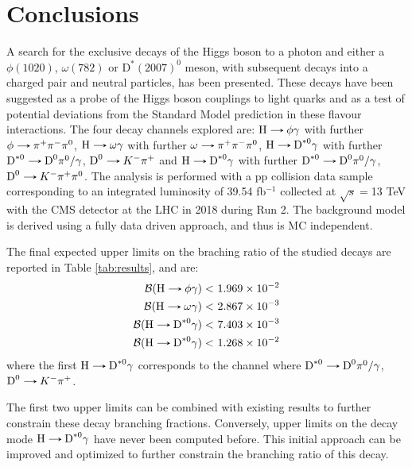 \chapter*{Conclusions}\label{chap:conclusions}

A search for the exclusive decays of the Higgs boson to a photon and either a $\phi(1020)$, $\omega(782)$ or $\text{D}^{*}(2007)^{0}$ meson, with subsequent decays into a charged pair and neutral particles, has been presented. These decays have been suggested as a probe of the Higgs boson couplings to light quarks and as a test of potential deviations from the Standard Model prediction in these flavour interactions. The four decay channels explored are: $\text{H}\decaysto \phi\gamma$ with further $\phi\decaysto \pi^+\pi^-\pi^0$, $\text{H}\decaysto \omega\gamma$ with further $\omega\decaysto \pi^+\pi^-\pi^0$, $\text{H}\decaysto \text{D}^{*0}\gamma$ with further $\text{D}^{*0}\decaysto \text{D}^{0}\pi^{0}/\gamma$, $\text{D}^{0}\decaysto K^{-}\pi^{+}$ and $\text{H}\decaysto \text{D}^{*0}\gamma$ with further $\text{D}^{*0}\decaysto \text{D}^{0}\pi^{0}/\gamma$, $\text{D}^{0}\decaysto K^{-}\pi^{+}\pi^{0}$. The analysis is performed with a pp collision data sample corresponding to an integrated luminosity of 39.54 fb$^{-1}$ collected at $\sqrt{s}=$13 TeV with the CMS detector at the LHC in 2018 during Run 2. The background model is derived using a fully data driven approach, and thus is MC independent.

The final expected upper limits on the braching ratio of the studied decays are reported in Table \ref{tab:results}, and are:
\begin{equation*}
    \begin{aligned}
        \mathcal{B}(\text{H}\decaysto \phi\gamma) <&\ 1.969 \times 10^{-2}\\
        \mathcal{B}(\text{H}\decaysto \omega\gamma) <&\ 2.867 \times 10^{-3}\\
        \mathcal{B}(\text{H}\decaysto\text{D}^{*0}\gamma) <&\ 7.403 \times 10^{-3}\\
        \mathcal{B}(\text{H}\decaysto\text{D}^{*0}\gamma) <&\ 1.268 \times 10^{-2}\\
\end{aligned}
\end{equation*}
where the first $\text{H}\decaysto\text{D}^{*0}\gamma$ corresponds to the channel where $\text{D}^{*0}\decaysto \text{D}^{0}\pi^{0}/\gamma$, $\text{D}^{0}\decaysto K^{-}\pi^{+}$.

The first two upper limits can be combined with existing results \cite{ATLAS:2017gko, ATLAS:2023alf} to further constrain these decay branching fractions. Conversely, upper limits on the decay mode $\text{H}\decaysto\text{D}^{*0}\gamma$ have never been computed before. This initial approach can be improved and optimized to further constrain the branching ratio of this decay.


\clearpage{\thispagestyle{empty}}

